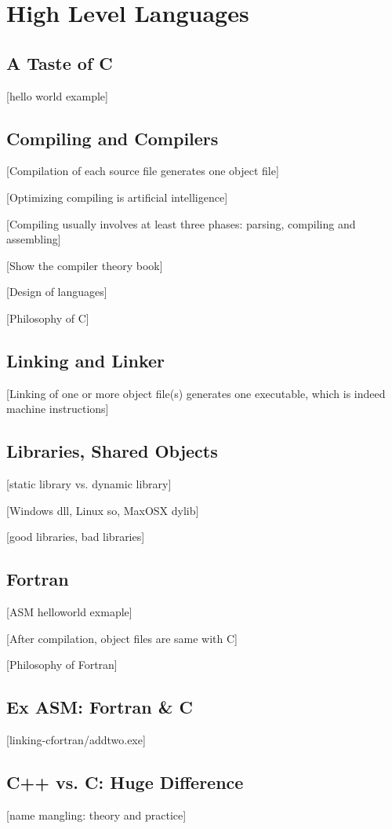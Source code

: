 \documentclass[main]{subfiles}
\begin{document}
\section{High Level Languages}
\subsection{A Taste of C}
[hello world example]
\subsection{Compiling and Compilers}
[Compilation of each source file generates one object file]

[Optimizing compiling is artificial intelligence]

[Compiling usually involves at least three phases: parsing, compiling and 
assembling]

[Show the compiler theory book]

[Design of languages]

[Philosophy of C] 
\subsection{Linking and Linker}
[Linking of one or more object file(s) generates one
executable, which is indeed machine instructions]

\subsection{Libraries, Shared Objects}
[static library vs. dynamic library]

[Windows dll, Linux so, MaxOSX dylib]

[good libraries, bad libraries]
\subsection{Fortran}
[ASM helloworld exmaple]

[After compilation, object files are same with C]

[Philosophy of Fortran] 
\subsection{Ex ASM: Fortran \& C}
[linking-cfortran/addtwo.exe]

\subsection{C++ vs. C: Huge Difference}
[name mangling: theory and practice]
\end{document}
